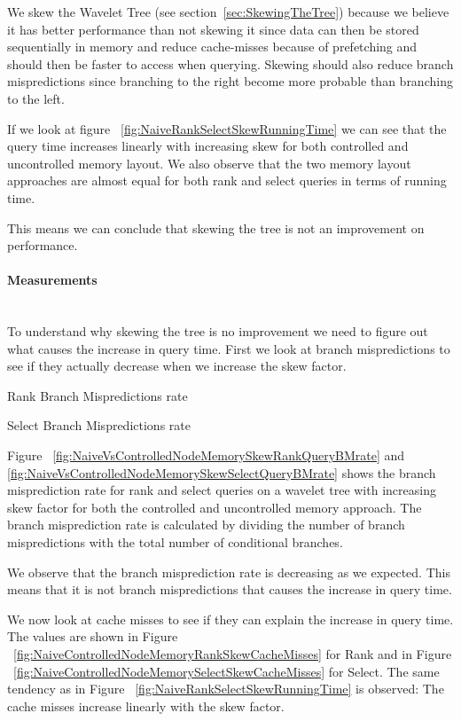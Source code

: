 We skew the Wavelet Tree (see section~\ref{sec:SkewingTheTree}) because we believe it has better performance than not skewing it since data can then be stored sequentially in memory and reduce cache-misses because of prefetching and should then be faster to access when querying. %
Skewing should also reduce branch mispredictions since branching to the right become more probable than branching to the left. 

If we look at figure ~\ref{fig:NaiveRankSelectSkewRunningTime} we can see that the query time increases linearly with increasing skew for both controlled and uncontrolled memory layout. We also observe that the two memory layout approaches are almost equal for both rank and select queries in terms of running time.

This means we can conclude that skewing the tree is not an improvement on performance.

\paragraph{Measurements}~\\
To understand why skewing the tree is no improvement we need to figure out what causes the increase in query time. 
First we look at branch mispredictions to see if they actually decrease when we increase the skew factor.%
\figureBegin
\caption{Rank Branch Mispredictions rate}
\label{fig:NaiveVsControlledNodeMemorySkewRankQueryBMrate}

\figureEnd%
\figureBegin
\caption{Select Branch Mispredictions rate}
\label{fig:NaiveVsControlledNodeMemorySkewSelectQueryBMrate}

\figureEnd
 
Figure ~\ref{fig:NaiveVsControlledNodeMemorySkewRankQueryBMrate} and \ref{fig:NaiveVsControlledNodeMemorySkewSelectQueryBMrate} shows the branch misprediction rate for rank and select queries on a wavelet tree with increasing skew factor for both the controlled and uncontrolled memory approach. 
The branch misprediction rate is calculated by dividing the number of branch mispredictions with the total number of conditional branches.

We observe that the branch misprediction rate is decreasing as we expected. 
This means that it is not branch mispredictions that causes the increase in query time. 

We now look at cache misses to see if they can explain the increase in query time. 
The values are shown in Figure ~\ref{fig:NaiveControlledNodeMemoryRankSkewCacheMisses} for Rank and in Figure ~\ref{fig:NaiveControlledNodeMemorySelectSkewCacheMisses} for Select.
The same tendency as in Figure ~\ref{fig:NaiveRankSelectSkewRunningTime} is observed: 
The cache misses increase linearly with the skew factor.

